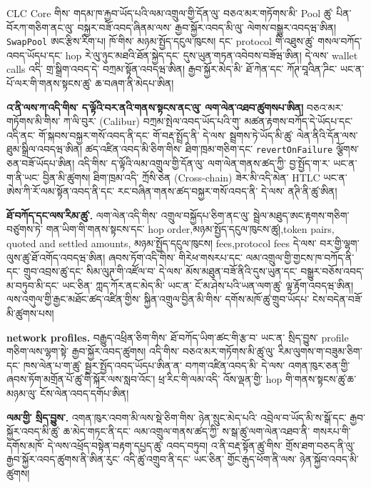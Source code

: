 \documentclass[11pt]{article}
\begin{document}
CLC Core གིས་ གདམ་ཁ་རྐྱབ་ཡོད་པའི་ལམ་འགྲུལ་གྱི་དོན་ལུ་ བཅའ་མར་གཏོགས་མི་ Pool ཚུ་ པིན་བོརཀ་གཅིག་ནང་ལུ་ བསྐྱར་བཟོ་འབད་ཞིནམ་ལས་ རྒྱབ་སྐྱོར་འབད་མི་ལུ་ ལེགས་བསྒྱུར་འབདཝ་ཨིན། \texttt{SwapPool} ཨང་རྩིས་རིག་པ། ཁོ་གིས་ མཉམ་སྤྱོད་དངུལ་ཁུངས། དང་ protocol གི་འཐུས་ཚུ་ གསལ་བཀོད་འབད་ཡོདཔ་དང་ hop རེ་ལུ་ཉུང་མཐའི་ཐོན་སྐྱེད་དང་ དུས་ཡུན་གཏན་འབེབས་བཟོཝ་ཨིན། དེ་ལས་ wallet calls འདི་ གྲ་སྒྲིག་འབད་དེ་ བཀྲམ་སྟོན་འབདཝ་ཨིན། རྒྱབ་སྐྱོར་མེད་མི་ ཐོ་ཀེན་དང་ ཀོཊ་བཱའིན་ཌིང་ ཡང་ན་ པོ་ལར་གི་གནས་སྟངས་ཚུ་ ཆ་བཞག་ནི་མེདཔ་ཨིན།

\textbf{འ་ནི་ལས་ཀ་འདི་གིས་ ད་ལྟོའི་བར་ནའི་གནས་སྟངས་ནང་ལུ་ ལག་ལེན་འཐབ་ཚུགསཔ་ཨིན།} བཅའ་མར་གཏོགས་མི་གིས་ ཀ་ལི་བུར་ (Calibur) བཀྲམ་སྤེལ་འབད་ཡོད་པའི་གུ་ མཚན་རྟགས་བཀོད་དེ་ཡོདཔ་དང་ འདི་ནང་ གོ་སྐབས་བསྐྱར་གསོ་འབད་ནི་དང་ གོ་བརྡ་སྤྲོད་ནི་ དེ་ལས་ སྦྲགས་ཏེ་ཡོད་མི་ཚུ་ ལེན་ནིའི་དོན་ལས་ ཐུམ་སྒྲིལ་འབདཝ་ཨིན། ཚད་འཛིན་འབད་མི་ཅིག་གིས་ ཐིག་ཁྲམ་གཅིག་དང་ \texttt{revertOnFailure} ལྕོགས་ཅན་བཟོ་ཡོདཔ་ཨིན། འདི་གིས་ ད་ལྟོའི་ལམ་འགྲུལ་གྱི་དོན་ལུ་ ལག་ལེན་གནས་ཚད་ཀྱི་ བྱ་སྤྱོད་ག་ར་ ཡང་ན་ ག་ནི་ཡང་ བྱིན་མི་ཚུགས། ཐིག་ཁྲམ་འདི་ ཀྲོསི་ཅེན (Cross-chain) ཟེར་མི་འདི་མེན་ HTLC ཡང་ན་ ཨེས་ཀི་རོ་ལམ་སྟོན་འབད་ནི་དང་ རང་བཞིན་གནས་ཚད་བསྐྱར་གསོ་འབད་ནི་ དེ་ལས་ ནཊི་ནི་ཚུ་ཨིན།

\textbf{ཐོ་བཀོད་དང་ལས་རིམ་ཚུ་.} ལག་ལེན་འདི་གིས་ འགྲུལ་བསྐྱོདཔ་ཅིག་ནང་ལུ་ སྦྲེལ་མཐུད་ཨང་རྟགས་གཅིག་བཙུགས་ཏེ་ གན་ཡིག་གི་གནས་སྟངས་དང་ hop order,མཉམ་སྤྱོད་དངུལ་ཁུངས་ཚུ།,token pairs, quoted and settled amounts, མཉམ་སྤྱོད་དངུལ་ཁུངས། fees,protocol fees དེ་ལས་ བར་གྱི་ལྷག་ལུས་ཚུ་ཐོ་འགོད་འབདཝ་ཨིན། ཞབས་ཏོག་འདི་གིས་ གིརེཕ་གསརཔ་དང་ ལམ་འགྲུལ་གྱི་གྱངས་ཁ་བཀོད་ནི་དང་ གྲུབ་འབྲས་ཚུ་དང་ སིམ་ལུཊ་གི་འཛོལ་བ་ དེ་ལས་ མོས་མཐུན་བཟོ་ནིའི་དུས་ཡུན་དང་ བསྒྱུར་བཅོས་འབད་མ་བཏུབ་མི་དང་ ཡང་ཅིན་ ཀླད་ཀོར་ནང་མེད་མི་ ཡང་ན་ ངོ་མ་ཤེས་པའི་ཡན་ལག་ཚུ་ ལྟ་རྟོག་འབདཝ་ཨིན། ལས་འགུལ་གྱི་རྒྱང་མཐོང་ཚད་འཛིན་གྱིས་ སྐྱིན་འགྲུལ་བྱིན་མི་གིས་ དགོས་མཁོ་ཚུ་གྲུབ་ཡོདཔ་ ངེས་བདེན་བཟོ་མི་ཚུགས་པས།

\textbf{network profiles.} བརྒྱུད་འཕྲིན་ཅིག་གིས་ ཐོ་བཀོད་ཡིག་ཚང་གི་རྩ་བ་ ཡང་ན་ སྲིད་བྱུས་ profile གཅིག་ལས་ལྷག་སྟེ་ རྒྱབ་སྐྱོར་འབད་ཚུགས། འདི་གིས་ བཅའ་མར་གཏོགས་མི་ཚུ་ལུ་ རིམ་ལུགས་ག་བཟུམ་ཅིག་དང་ ཁས་ལེན་པ་ག་ཚུ་ སྦྱར་སྤྱོད་འབད་ཡོདཔ་ཨིན་ན་ བཀག་འཛིན་འབད་མི་ དེ་ལས་ འགན་ཁུར་ཅན་གྱི་ ཞབས་ཏོག་མགྲོན་པོ་ཚུ་གི་སྐོར་ལས་སླབ་འོང་། ཕྲ་རིང་གི་ལམ་འདི་ འོས་ལྡན་གྱི་ hop གི་གནས་སྟངས་ཚུ་ཆ་མཉམ་ལུ་ ངོས་ལེན་འབད་དགོཔ་ཨིན།

\textbf{ལམ་གྱི་ སྲིད་བྱུས་.} འགན་ཁུར་འབག་མི་ལས་སྡེ་ཅིག་གིས་ ཉེན་སྲུང་མེད་པའི་ འབྲེལ་བ་ཡོད་མི་ས་སྒོ་དང་ རྒྱབ་སྐྱོར་འབད་མི་ཚུ་ ཆ་མེད་གཏང་ནི་དང་ ལམ་འགྲུལ་གནས་ཚད་ཀྱི་ ས་སྒ་ཚུ་ལག་ལེན་འཐབ་ནི་ གསརཔ་གི་དགོས་མཁོ་ དེ་ལས་འཕྲོད་བསྟེན་བརྟག་དཔྱད་ཚུ་ འབད་བཏུབ། འ་ནི་བརྡ་སྟོན་ཚུ་གིས་ གྲོས་ཐག་བཅད་ནི་ལུ་ རྒྱབ་སྐྱོར་འབད་ཚུགས་ནི་ཨིན་རུང་ འདི་ཚུ་འགྲུབ་ནི་དང་ ཡང་ཅིན་ གྱོང་རྒུད་ཕོག་ནི་ལས་ ཉེན་སྐྱོབ་འབད་མི་ཚུགས།
\end{document}
